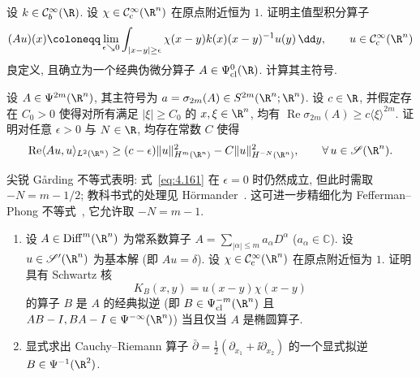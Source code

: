 \begin{exer}[一个经典伪微分算子]\label{ex:4.4}
设 $k \in \mathcal{C}_b^\infty(\R)$. 设 $\chi \in \SmoothComp(\R^n)$ 在原点附近恒为 $1$. 证明主值型积分算子
\begin{equation}\label{eq:4.160}
    (A u)(x) \defeq \lim_{\epsilon \searrow 0} \int_{|x-y| \ge \epsilon} \chi(x - y) k(x) (x - y)^{-1} u(y) \,\dd y, \qquad u \in \SmoothComp(\R^n)
\end{equation}
良定义, 且确立为一个经典伪微分算子 $A \in \Psi_{\mathrm{cl}}^0(\R)$. 计算其主符号.
\end{exer}

\begin{exer}\label{ex:4.5}
设 $A \in \Psi^{2m}(\R^n)$, 其主符号为 $a = \sigma_{2m}(A) \in S^{2m}(\R^n; \R^n)$. 设 $c \in \R$, 并假定存在 $C_0 > 0$ 使得对所有满足 $|\xi| \ge C_0$ 的 $x, \xi \in \R^n$, 均有 $\operatorname{Re} \sigma_{2m}(A) \ge c \langle \xi \rangle^{2m}$. 证明对任意 $\epsilon > 0$ 与 $N \in \R$, 均存在常数 $C$ 使得
\begin{equation}\label{eq:4.161}
    \operatorname{Re} \langle A u, u \rangle_{L^2(\R^n)} \ge (c - \epsilon) \|u\|_{H^m(\R^n)}^2 - C \|u\|_{H^{-N}(\R^n)}^2, \qquad \forall\,u \in \Schwartz(\R^n).
\end{equation}
\begin{remark}
尖锐 Gårding 不等式表明: 式~\eqref{eq:4.161} 在 $\epsilon = 0$ 时仍然成立, 但此时需取 $-N = m - 1/2$; 教科书式的处理见 Hörmander~\cite[定理 18.1.14]{Hor03}. 这可进一步精细化为 Fefferman--Phong 不等式~\cite{FP78}, 它允许取 $-N = m - 1$.
\end{remark}
\end{exer}

\begin{exer}[逆算子与拟逆]\label{ex:4.6}
\begin{enumerate}
    \item 设 $A \in \Diff^m(\R^n)$ 为常系数算子 $A = \sum_{|\alpha| \le m} a_\alpha D^\alpha$ ($a_\alpha \in \mathbb{C}$). 设 $u \in \TempDistr(\R^n)$ 为基本解 (即 $A u = \delta$). 设 $\chi \in \SmoothComp(\R^n)$ 在原点附近恒为 $1$. 证明具有 Schwartz 核
    \begin{equation}\label{eq:4.162}
        K_B(x, y) = u(x - y) \chi(x - y)
    \end{equation}
    的算子 $B$ 是 $A$ 的经典拟逆 (即 $B \in \Psi_{\mathrm{cl}}^{-m}(\R^n)$ 且 $A B - I, B A - I \in \Psi^{-\infty}(\R^n)$) 当且仅当 $A$ 是椭圆算子.
    \item 显式求出 Cauchy--Riemann 算子 $\bar{\partial} = \frac{1}{2}(\partial_{x_1} + \ii \partial_{x_2})$ 的一个显式拟逆 $B \in \Psi^{-1}(\R^2)$.
\end{enumerate}
\end{exer}

